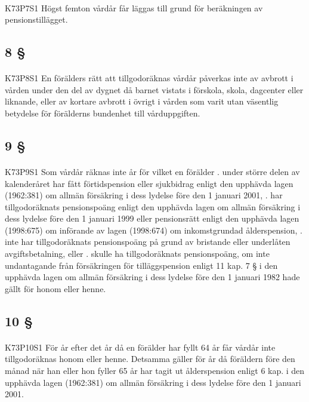 \documentclass[a4paper,notitlepage,openany,10pt]{book}
\begin{document}
\paragraph*{}
{\tiny K73P7S1}
Högst femton vårdår får läggas till grund för beräkningen av pensionstillägget.
\subsection*{8 §}
\paragraph*{}
{\tiny K73P8S1}
En förälders rätt att tillgodoräknas vårdår påverkas inte av avbrott i vården under den del av dygnet då barnet vistats i förskola, skola, dagcenter eller liknande, eller av kortare avbrott i övrigt i vården som varit utan väsentlig betydelse för förälderns bundenhet till vårduppgiften.
\subsection*{9 §}
\paragraph*{}
{\tiny K73P9S1}
Som vårdår räknas inte år för vilket en förälder
. under större delen av kalenderåret har fått förtidspension eller sjukbidrag enligt den upphävda lagen (1962:381) om allmän försäkring i dess lydelse före den 1 januari 2001,
. har tillgodoräknats pensionspoäng enligt den upphävda lagen om allmän försäkring i dess lydelse före den 1 januari 1999 eller pensionsrätt enligt den upphävda lagen (1998:675) om införande av lagen (1998:674) om inkomstgrundad ålderspension,
. inte har tillgodoräknats pensionspoäng på grund av bristande eller underlåten avgiftsbetalning, eller
. skulle ha tillgodoräknats pensionspoäng, om inte undantagande från försäkringen för tilläggspension enligt 11 kap. 7 § i den upphävda lagen om allmän försäkring i dess lydelse före den 1 januari 1982 hade gällt för honom eller henne.
\subsection*{10 §}
\paragraph*{}
{\tiny K73P10S1}
För år efter det år då en förälder har fyllt 64 år får vårdår inte tillgodoräknas honom eller henne. Detsamma gäller för år då föräldern före den månad när han eller hon fyller 65 år har tagit ut ålderspension enligt 6 kap. i den upphävda lagen (1962:381) om allmän försäkring i dess lydelse före den 1 januari 2001.
\end{document}
